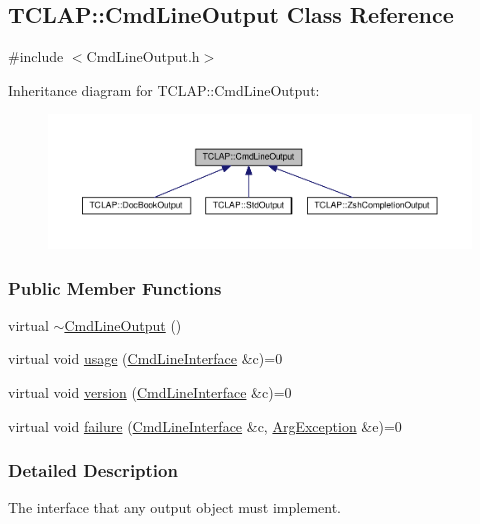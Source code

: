 \hypertarget{classTCLAP_1_1CmdLineOutput}{}\subsection{T\+C\+L\+AP\+:\+:Cmd\+Line\+Output Class Reference}
\label{classTCLAP_1_1CmdLineOutput}


{\ttfamily \#include $<$Cmd\+Line\+Output.\+h$>$}



Inheritance diagram for T\+C\+L\+AP\+:\+:Cmd\+Line\+Output\+:
\nopagebreak
\begin{figure}[H]
\begin{center}
\leavevmode
\includegraphics[width=350pt]{classTCLAP_1_1CmdLineOutput__inherit__graph}
\end{center}
\end{figure}
\subsubsection*{Public Member Functions}
\begin{DoxyCompactItemize}
\item 
virtual \hyperlink{classTCLAP_1_1CmdLineOutput_afdf4435a2619076d9798a0a950ed405b}{$\sim$\+Cmd\+Line\+Output} ()
\item 
virtual void \hyperlink{classTCLAP_1_1CmdLineOutput_a685b13db5bf6bbe5159e49169cd96bbe}{usage} (\hyperlink{classTCLAP_1_1CmdLineInterface}{Cmd\+Line\+Interface} \&c)=0
\item 
virtual void \hyperlink{classTCLAP_1_1CmdLineOutput_ae052fea473132482296de55edb3dd480}{version} (\hyperlink{classTCLAP_1_1CmdLineInterface}{Cmd\+Line\+Interface} \&c)=0
\item 
virtual void \hyperlink{classTCLAP_1_1CmdLineOutput_ad23a57ac3d8d957a4328fc78aec94e16}{failure} (\hyperlink{classTCLAP_1_1CmdLineInterface}{Cmd\+Line\+Interface} \&c, \hyperlink{classTCLAP_1_1ArgException}{Arg\+Exception} \&e)=0
\end{DoxyCompactItemize}


\subsubsection{Detailed Description}
The interface that any output object must implement. 

